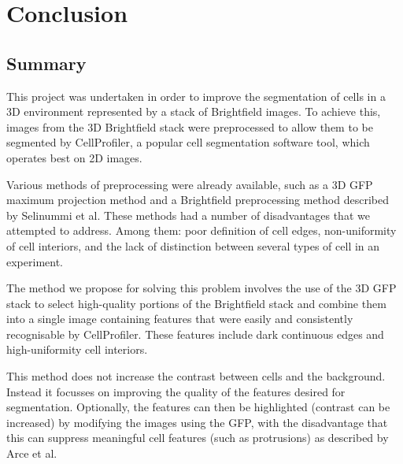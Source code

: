 
\chapter{Conclusion}

\ifpdf
    \graphicspath{{Chapter8/Figs/Raster/}{Chapter8/Figs/PDF/}{Chapter8/Figs/}}
\else
    \graphicspath{{Chapter8/Figs/Vector/}{Chapter8/Figs/}}
\fi

\section{Summary}

This project was undertaken in order to improve the segmentation of cells in a 3D environment represented by a stack of Brightfield images. To achieve this, images from the 3D Brightfield stack were preprocessed to allow them to be segmented by CellProfiler, a popular cell segmentation software tool, which operates best on 2D images.

Various methods of preprocessing were already available, such as a 3D GFP maximum projection method and a Brightfield preprocessing method described by Selinummi et al. These methods had a number of disadvantages that we attempted to address. Among them: poor definition of cell edges, non-uniformity of cell interiors, and the lack of distinction between several types of cell in an experiment.

The method we propose for solving this problem involves the use of the 3D GFP stack to select high-quality portions of the Brightfield stack and combine them into a single image containing features that were easily and consistently recognisable by CellProfiler. These features include dark continuous edges and high-uniformity cell interiors.

This method does not increase the contrast between cells and the background. Instead it focusses on improving the quality of the features desired for segmentation. Optionally, the features can then be highlighted (contrast can be increased) by modifying the images using the GFP, with the disadvantage that this can suppress meaningful cell features (such as protrusions) as described by Arce et al.

